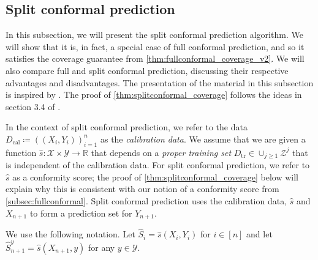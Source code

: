 \documentclass[11pt, titlepage]{article} %
\numberwithin{equation}{section}
\theoremstyle{definition}
\numberwithin{theorem}{section}
\numberwithin{lemma}{section}
\numberwithin{corollary}{section}
\numberwithin{proposition}{section}
\numberwithin{definition}{section}
\numberwithin{remark}{section}
\begin{document}

\subsection{Split conformal prediction}
\label{subsec:splitconformal}

In this subsection, we will present the split conformal prediction algorithm. We will show that it is, in fact, a special case of full conformal prediction, and so it satisfies the coverage guarantee from \cref{thm:fullconformal_coverage_v2}. We will also compare full and split conformal prediction, discussing their respective advantages and disadvantages. The presentation of the material in this subsection is inspired by \cite{angelopoulos2024theoreticalfoundationsconformalprediction,angelopoulos2021gentle,tibs_advanced_topics}. The proof of \cref{thm:splitconformal_coverage} follows the ideas in section 3.4 of \cite{angelopoulos2024theoreticalfoundationsconformalprediction}.\vskip5pt

\noindent
In the context of split conformal prediction, we refer to the data \(D_\mathrm{cal} \coloneqq ((X_i, Y_i))_{i=1}^n\) as the \textit{calibration data}. We assume that we are given a function \(\hat{s}:\mathcal{X} \times \mathcal{Y} \to \mathbb{R}\) that depends on a \textit{proper training set} \(D_\mathrm{tr} \in \cup_{j \geq 1} \mathcal{Z}^j \) that is independent of the calibration data. For split conformal prediction, we refer to \(\hat{s}\) as a conformity score; the proof of \cref{thm:splitconformal_coverage} below will explain why this is consistent with our notion of a conformity score from \cref{subsec:fullconformal}. Split conformal prediction uses the calibration data, \(\hat{s}\) and \(X_{n+1}\) to form a prediction set for \(Y_{n+1}\). \vskip5pt

\noindent
We use the following notation. Let \(\hat{S}_i = \hat{s}(X_i, Y_i)\) for \(i \in [n]\) and let \(\hat{S}_{n+1}^y = \hat{s}(X_{n+1}, y)\) for any \(y \in \mathcal{Y}\).
\end{document}
